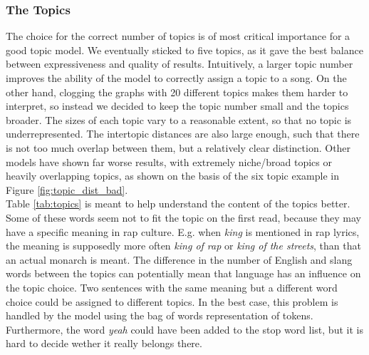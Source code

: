 \documentclass[conference]{IEEEtran}
\begin{document}
\subsubsection{The Topics} \label{discussion_topics}
The choice for the correct number of topics is of most critical importance for a good topic model. We eventually sticked to five topics, as it gave the best balance between expressiveness and quality of results. Intuitively, a larger topic number improves the ability of the model to correctly assign a topic to a song. On the other hand, clogging the graphs with 20 different topics makes them harder to interpret, so instead we decided to keep the topic number small and the topics broader. The sizes of each topic vary to a reasonable extent, so that no topic is underrepresented. The intertopic distances are also large enough, such that there is not too much overlap between them, but a relatively clear distinction. Other models have shown far worse results, with extremely niche/broad topics or heavily overlapping topics, as shown on the basis of the six topic example in Figure \ref{fig:topic_dist_bad}.\\
Table \ref{tab:topics} is meant to help understand the content of the topics better. Some of these words seem not to fit the topic on the first read, because they may have a specific meaning in rap culture. E.g. when \textit{king} is mentioned in rap lyrics, the meaning is supposedly more often \textit{king of rap} or \textit{king of the streets}, than that an actual monarch is meant. The difference in the number of English and slang words between the topics can potentially mean that language has an influence on the topic choice. Two sentences with the same meaning but a different word choice could be assigned to different topics. In the best case, this problem is handled by the model using the bag of words representation of tokens. Furthermore, the word \textit{yeah} could have been added to the stop word list, but it is hard to decide wether it really belongs there.
\end{document}
